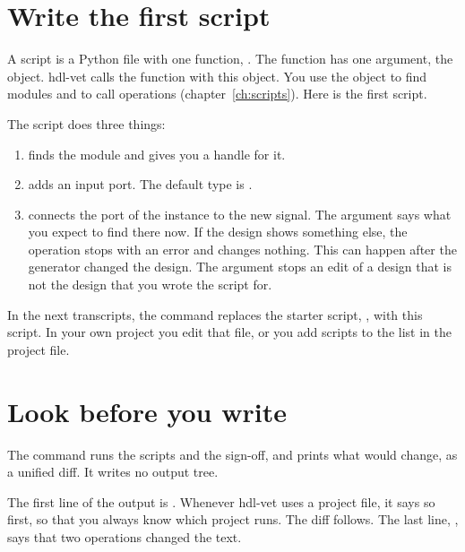 \section{Write the first script}

A script is a Python file with one function, . The function has one
argument, the  object. hdl-vet calls the function with this object. You use
the object to find modules and to call operations (chapter~\ref{ch:scripts}). Here is the first script.



The script does three things:

\begin{enumerate}
\item {} finds the module  and gives
  you a handle for it.
\item {} adds an input port. The default type
  is .
\item {} connects the port
   of the instance  to the new signal. The
  argument  says what you expect to find there now. If the design shows
  something else, the operation stops with an error and changes nothing. This can
  happen after the generator changed the design. The argument  stops an edit
  of a design that is not the design that you wrote the script for.
\end{enumerate}

In the next transcripts, the command  replaces the starter script,
, with this script. In your own project you edit
that file, or you add scripts to the list  in the project file.

\section{Look before you write}

The command  runs the scripts and the sign-off, and
prints what would change, as a unified diff. It writes no output tree.



The first line of the output is . Whenever hdl-vet uses a project
file, it says so first, so that you always know which project runs. The diff follows.
The last line, , says that two operations changed the text.


